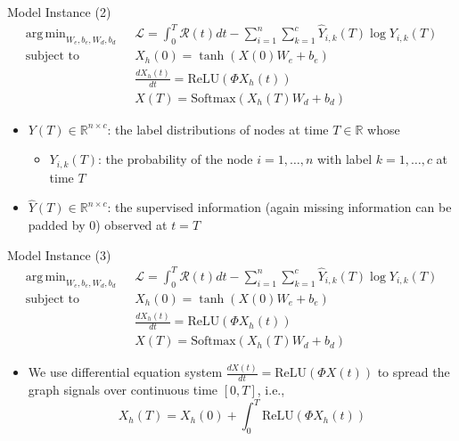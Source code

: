 \documentclass{beamer}
\DeclareMathOperator*{\argmin}{arg\,min}
\begin{document}
\begin{frame}{Model Instance (2)}\[
\begin{split}
\argmin_{W_e,b_e,W_d,b_d}\text{ }&\mathcal{L}=\int_0^T\mathcal{R}(t)dt-\sum_{i=1}^n\sum_{k=1}^c\hat{Y}_{i,k}(T)\log Y_{i,k}(T)\\
\text{subject to }&X_h(0)=\tanh(X(0)W_e+b_e)\\
&\frac{dX_h(t)}{dt}=\text{ReLU}(\Phi X_h(t))\\
&X(T)=\text{Softmax}(X_h(T)W_d+b_d)
\end{split}
\]
\begin{itemize}
\item $Y(T)\in\mathbb{R}^{n\times c}$: the label distributions of nodes at time $T\in\mathbb{R}$ whose 
\begin{itemize}
\item $Y_{i,k}(T)$: the probability of the node $i=1,\dots,n$ with label $k=1,\dots,c$ at time $T$
\end{itemize}
\item $\hat{Y}(T)\in\mathbb{R}^{n\times c}$: the supervised information (again missing information can be padded by $0$) observed at $t=T$
\end{itemize}
\end{frame}

\begin{frame}{Model Instance (3)}\[
\begin{split}
\argmin_{W_e,b_e,W_d,b_d}\text{ }&\mathcal{L}=\int_0^T\mathcal{R}(t)dt-\sum_{i=1}^n\sum_{k=1}^c\hat{Y}_{i,k}(T)\log Y_{i,k}(T)\\
\text{subject to }&X_h(0)=\tanh(X(0)W_e+b_e)\\
&\frac{dX_h(t)}{dt}=\text{ReLU}(\Phi X_h(t))\\
&X(T)=\text{Softmax}(X_h(T)W_d+b_d)
\end{split}
\]
\begin{itemize}
\item We use differential equation system $\frac{dX(t)}{dt}=\text{ReLU}(\Phi X(t))$ to spread the graph signals over continuous time $[0,T]$, i.e.,\[
X_h(T)=X_h(0)+\int_0^T\text{ReLU}(\Phi X_h(t))
\]
\end{itemize}
\end{frame}
\end{document}
